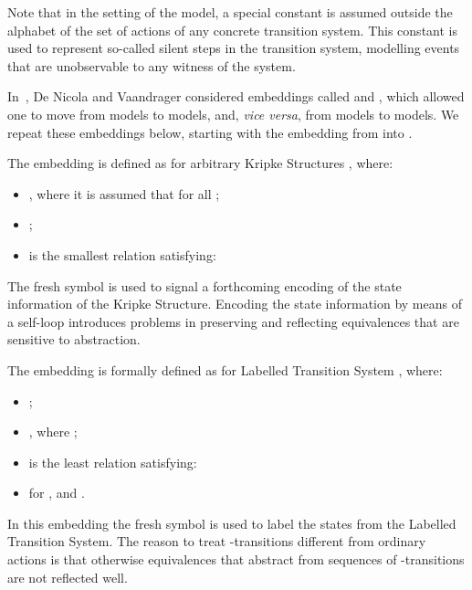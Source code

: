 \documentclass{llncs}
\begin{document}
Note that in the setting of the \LTS model, a special constant 
is assumed outside the alphabet of the set of actions  of any
concrete transition system. This constant is used to represent so-called
silent steps in the transition system, modelling events that are
unobservable to any witness of the system.



In~\cite{DBLP:conf/litp/NicolaV90}, De Nicola and Vaandrager considered
embeddings called  and , which allowed one to move from \KS
models to \LTS models, and, \emph{vice versa}, from \LTS models to \KS
models. We repeat these embeddings below, starting with the embedding
from \KS into \LTS.

\newcommand{\shadow}[1]{\ensuremath{\bar{#1}}}
\begin{definition}
\label{translationlts}
The embedding  is defined as  for arbitrary Kripke Structures , where:

\begin{itemize}
\item , where
it is assumed that  for all ;
\item ;
\item  is the smallest relation satisfying:

\end{itemize}
\end{definition}
The fresh symbol  is used to signal a forthcoming encoding of the state information of the Kripke Structure. Encoding the state information by means of a self-loop  introduces problems in preserving and reflecting equivalences that are sensitive to abstraction.

\begin{definition}
\label{translationks}
The embedding  is formally defined as
 for Labelled Transition
System , where:
\begin{itemize}
\item ;
\item , where ;
\item  is the least relation satisfying:

\item  for , and .
\end{itemize}
\end{definition}
In this embedding the fresh symbol  is used to label the states from the Labelled Transition System.
The reason to treat -transitions different from ordinary actions is that otherwise equivalences that abstract from sequences of -transitions are not reflected well.
\end{document}
